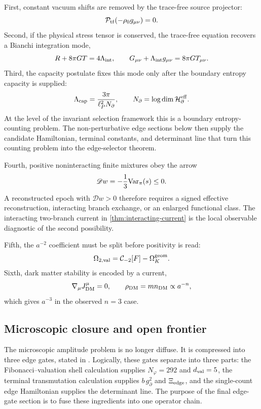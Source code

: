 \documentclass[aps,prd,reprint,nofootinbib,superscriptaddress,floatfix]{revtex4-2}
\numberwithin{equation}{section}
\theoremstyle{definition}
\theoremstyle{plain}
\newcommand{\Dil}{\mathscr D}
\newcommand{\Ptr}{\mathcal P_{\rm tf}}
\begin{document}
First, constant vacuum shifts are removed by the trace-free source
projector:
\[
\Ptr(-\rho_0g_{\mu\nu})=0.
\]
Second, if the physical stress tensor is conserved, the trace-free equation
recovers a Bianchi integration mode,
\[
R+8\pi GT=4\Lambda_{\rm int},
\qquad
G_{\mu\nu}+\Lambda_{\rm int}g_{\mu\nu}=8\pi GT_{\mu\nu}.
\]
Third, the capacity postulate fixes this mode only after the boundary entropy
capacity is supplied:
\[
\Lambda_{\rm cap}=\frac{3\pi}{\ell_P^2N_\partial},
\qquad
N_\partial=\log\dim \mathcal H_{\partial}^{\rm eff}.
\]
At the level of the invariant selection framework this is a boundary entropy-counting
problem.  The non-perturbative edge sections below then supply the candidate
Hamiltonian, terminal constants, and determinant line that turn this counting
problem into the edge-selector theorem.

Fourth, positive noninteracting finite mixtures obey the arrow
\[
\Dil w=-\frac13{\rm Var}_\pi(s)\le0.
\]
A reconstructed epoch with \(\Dil w>0\) therefore requires a signed
effective reconstruction, interacting branch exchange, or an enlarged
functional class.  The interacting two-branch current in
\cref{thm:interacting-current} is the local observable diagnostic of the
second possibility.

Fifth, the \(a^{-2}\) coefficient must be split before positivity is read:
\[
\Omega_{2,{\rm val}}=\mathcal C_{-2}[F]-\Omega_K^{\rm geom}.
\]
Sixth, dark matter stability is encoded by a current,
\[
\nabla_\mu J^\mu_{\rm DM}=0,\qquad
\rho_{\rm DM}=m n_{\rm DM}\propto a^{-n},
\]
which gives \(a^{-3}\) in the observed \(n=3\) case.



\subsection{Microscopic closure and open frontier}

The microscopic amplitude problem is no longer diffuse.  It is compressed into
three edge gates, stated in .  Logically, these gates separate into three parts:
the Fibonacci--valuation shell calculation supplies \(N_\varphi=292\) and
\(d_{\rm val}=5\), the terminal transmutation calculation supplies
\(b\,g_\partial^2\) and \(\Xi_{\rm edge}\), and the single-count edge
Hamiltonian supplies the determinant line.  The purpose of the final edge-gate
section is to fuse these ingredients into one operator chain.
\end{document}
